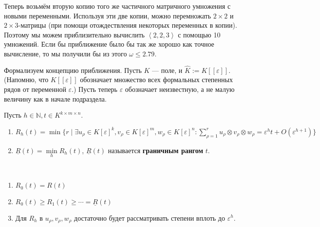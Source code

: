 Теперь возьмём вторую копию того же частичного матричного умножения с новыми переменными. Используя эти две копии, можно перемножать $2 \times 2$ и $2 \times 3$-матрицы (при помощи отождествления некоторых переменных в копии). Поэтому мы можем приблизительно вычислить $\left\langle 2,2,3 \right\rangle$ с помощью 10 умножений. Если бы приближение было бы так же хорошо как точное вычисление, то мы получили бы из этого $\omega \leq 2.79$.

Формализуем концепцию приближения. Пусть $K$ --- поле, и $\widehat{K}:=K[[\varepsilon]]$. (Напомню, что $K[[\varepsilon]]$ обозначает множество всех формальных степенных рядов от переменной $\varepsilon$.) Пусть теперь $\varepsilon$ обозначает неизвестную, а не малую величину как в начале подраздела.

\begin{definition}\label{def:bi:5.1}
	Пусть $h \in \mathbb{N}, t \in K^{k \times m \times n}$.
	\begin{enumerate}
		\item $R_h(t) = \min\{ r \mid \exists u_\rho \in K[\varepsilon]^k, v_\rho \in K[\varepsilon]^m, w_\rho \in K[\varepsilon]^n : \sum_{\rho=1}^r u_{\rho} \otimes v_{\rho} \otimes w_{\rho} = \varepsilon^h t + O(\varepsilon^{h+1}) \}$
		\item $\underline{R}(t)=\min\limits_h R_h(t)$, $\underline{R}(t)$ называется \textbf{граничным рангом} $t$.
	\end{enumerate}
\end{definition}

\begin{remark}\label{rem:bi:5.2}\ 
	\begin{enumerate}
		\item $R_0(t)= R(t)$
		\item $R_0(t) \geq R_1(t) \geq \dotsb = \underline{R}(t)$
		\item Для $R_h$ в $u_{\rho}, v_{\rho}, w_{\rho}$ достаточно будет рассматривать степени вплоть до $\varepsilon^h$.
	\end{enumerate}
\end{remark}

